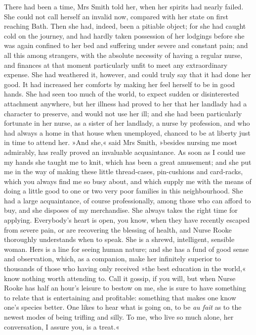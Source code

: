 There had been a time, Mrs Smith told her, when her spirits had nearly failed. She could not call herself an invalid now, compared with her state on first reaching Bath. Then she had, indeed, been a pitiable object; for she had caught cold on the journey, and had hardly taken possession of her lodgings before she was again confined to her bed and suffering under severe and constant pain; and all this among strangers, with the absolute necessity of having a regular nurse, and finances at that moment particularly unfit to meet any extraordinary expense. She had weathered it, however, and could truly say that it had done her good. It had increased her comforts by making her feel herself to be in good hands. She had seen too much of the world, to expect sudden or disinterested attachment anywhere, but her illness had proved to her that her landlady had a character to preserve, and would not use her ill; and she had been particularly fortunate in her nurse, as a sister of her landlady, a nurse by profession, and who had always a home in that house when unemployed, chanced to be at liberty just in time to attend her. »And she,« said Mrs Smith, »besides nursing me most admirably, has really proved an invaluable acquaintance. As soon as I could use my hands she taught me to knit, which has been a great amusement; and she put me in the way of making these little thread-cases, pin-cushions and card-racks, which you always find me so busy about, and which supply me with the means of doing a little good to one or two very poor families in this neighbourhood. She had a large acquaintance, of course professionally, among those who can afford to buy, and she disposes of my merchandise. She always takes the right time for applying. Everybody's heart is open, you know, when they have recently escaped from severe pain, or are recovering the blessing of health, and Nurse Rooke thoroughly understands when to speak. She is a shrewd, intelligent, sensible woman. Hers is a line for seeing human nature; and she has a fund of good sense and observation, which, as a companion, make her infinitely superior to thousands of those who having only received »the best education in the world,« know nothing worth attending to. Call it gossip, if you will, but when Nurse Rooke has half an hour's leisure to bestow on me, she is sure to have something to relate that is entertaining and profitable: something that makes one know one's species better. One likes to hear what is going on, to be \textit{au fait} as to the newest modes of being trifling and silly. To me, who live so much alone, her conversation, I assure you, is a treat.«

